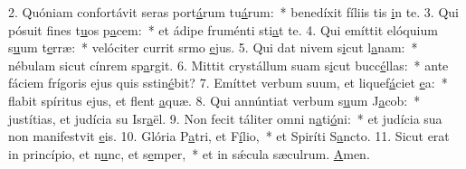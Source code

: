2. Quóniam confortávit seras port\uline{á}rum tu\uline{á}rum:~* benedíxit fíliis tis \uline{i}n te.
3. Qui pósuit fines t\uline{u}os p\uline{a}cem:~* et ádipe fruménti sti\uline{a}t te.
4. Qui emíttit elóquium s\uline{u}um t\uline{e}rræ:~* velóciter currit srmo \uline{e}jus.
5. Qui dat nivem s\uline{i}cut l\uline{a}nam:~* nébulam sicut cínrem sp\uline{a}rgit.
6. Mittit crystállum suam s\uline{i}cut bucc\uline{é}llas:~* ante fáciem frígoris ejus quis sstin\uline{é}bit?
7. Emíttet verbum suum, et liquef\uline{á}ciet \uline{e}a:~* flabit spíritus ejus, et flent \uline{a}quæ.
8. Qui annúntiat verbum s\uline{u}um J\uline{a}cob:~* justítias, et judícia su Isr\uline{a}ël.
9. Non fecit táliter omni n\uline{a}ti\uline{ó}ni:~* et judícia sua non manifestvit \uline{e}is.
10. Glória P\uline{a}tri, et F\uline{í}lio,~* et Spiríti S\uline{a}ncto.
11. Sicut erat in princípio, et n\uline{u}nc, et s\uline{e}mper,~* et in sǽcula sæculrum. \uline{A}men.
